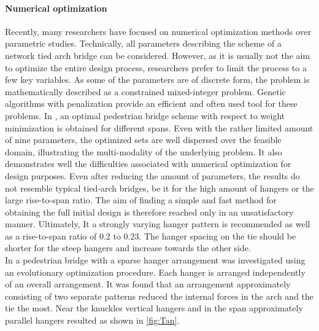 \paragraph*{Numerical optimization}
Recently, many researchers have focused on numerical optimization methods over parametric studies. Technically, all parameters describing the scheme of a network tied arch bridge can be considered. However, as it is usually not the aim to optimize the entire design process, researchers prefer to limit the process to a few key variables. As some of the parameters are of discrete form, the problem is mathematically described as a constrained mixed-integer problem. Genetic algorithms with penalization provide an efficient and often used tool for these problems. In \citep{Belevicius}, an optimal pedestrian bridge scheme with respect to weight minimization is obtained for different spans. Even with the rather limited amount of nine parameters, the optimized sets are well dispersed over the feasible domain, illustrating the multi-modality of the underlying problem.
It also demonstrates well the difficulties associated with numerical optimization for design purposes. Even after reducing the amount of parameters, the results do not resemble typical tied-arch bridges, be it for the high amount of hangers or the large rise-to-span ratio. The aim of finding a simple and fast method for obtaining the full initial design is therefore reached only in an unsatisfactory manner. Ultimately, It a strongly varying hanger pattern is recommended as well as a rise-to-span ratio of 0.2 to 0.23. The hanger spacing on the tie should be shorter for the steep hangers and increase towards the other side.\\

In \citep{Tan} a pedestrian bridge with a sparse hanger arrangement was investigated using an evolutionary optimization procedure. Each hanger is arranged independently of an overall arrangement. It was found that an arrangement approximately consisting of two separate patterns reduced the internal forces in the arch and the tie the most. Near the knuckles vertical hangers and in the span approximately parallel hangers resulted as shown in \autoref{fig:Tan}.

